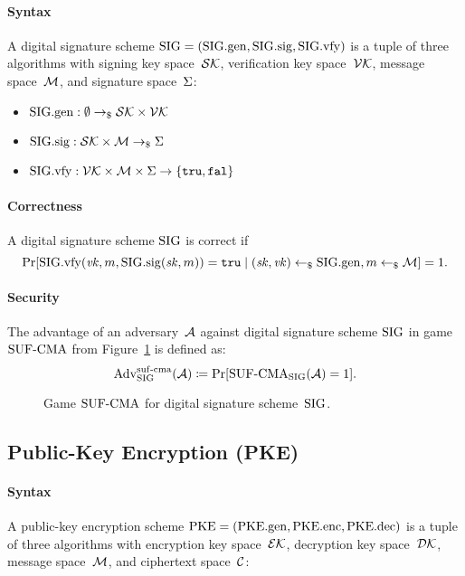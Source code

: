 \documentclass[a4paper,orivec]{llncs}
\begin{document}
\paragraph{Syntax}
A digital signature scheme $\mathrm{SIG}=(\mathrm{SIG}.\mathrm{gen},\mathrm{SIG}.\mathrm{sig},\mathrm{SIG}.\mathrm{vfy})$ is a tuple of three algorithms with signing key space~$\mathcal{SK}$, verification key space~$\mathcal{VK}$, message space~$\mathcal{M}$, and signature space~$\Sigma$:

\begin{itemize}
    \item $\mathrm{SIG}.\mathrm{gen}: \emptyset \to_\$ \mathcal{SK}\times\mathcal{VK}$
    \item $\mathrm{SIG}.\mathrm{sig}: \mathcal{SK}\times\mathcal{M} \to_\$ \Sigma$
    \item $\mathrm{SIG}.\mathrm{vfy}: \mathcal{VK}\times\mathcal{M}\times\Sigma \to \{\mathtt{tru},\mathtt{fal}\}$
\end{itemize}

\paragraph{Correctness}
A digital signature scheme $\mathrm{SIG}$ is correct if
\[
\Pr[\mathrm{SIG}.\mathrm{vfy}(\mathit{vk},m,\mathrm{SIG}.\mathrm{sig}(\mathit{sk},m))=\mathtt{tru}\mid (\mathit{sk},\mathit{vk})\gets_\$\mathrm{SIG}.\mathrm{gen},m\gets_\$\mathcal{M}]=1\text{.}
\]

\paragraph{Security}
The advantage of an adversary~$\mathcal{A}$ against digital signature scheme $\mathrm{SIG}$ in game ${\mathrm{SUF}\text{-}\mathrm{CMA}}$ from Figure~\ref{fig:sig:suf} is defined as:
\[
\mathrm{Adv}_{\mathrm{SIG}}^{\mathrm{suf}\text{-}\mathrm{cma}}(\mathcal{A})\coloneqq\Pr[{\mathrm{SUF}\text{-}\mathrm{CMA}}_{\mathrm{SIG}}(\mathcal{A})=1]\text{.}
\]

\begin{figure}[!ht]
    \centering
    \nicoresetlinenr%
    \fbox{%
        \scalebox{\codescalefactor}{%
        }%
    }
    \caption{%
        Game ${\mathrm{SUF}\text{-}\mathrm{CMA}}$ for digital signature scheme~$\mathrm{SIG}$.
    }
    \label{fig:sig:suf}
\end{figure}

\subsection{Public-Key Encryption (PKE)}

\paragraph{Syntax}
A public-key encryption scheme $\mathrm{PKE}=(\mathrm{PKE}.\mathrm{gen},\mathrm{PKE}.\mathrm{enc},\mathrm{PKE}.\mathrm{dec})$ is a tuple of three algorithms with encryption key space~$\mathcal{EK}$, decryption key space~$\mathcal{DK}$, message space~$\mathcal{M}$, and ciphertext space~$\mathcal{C}$:
\end{document}
